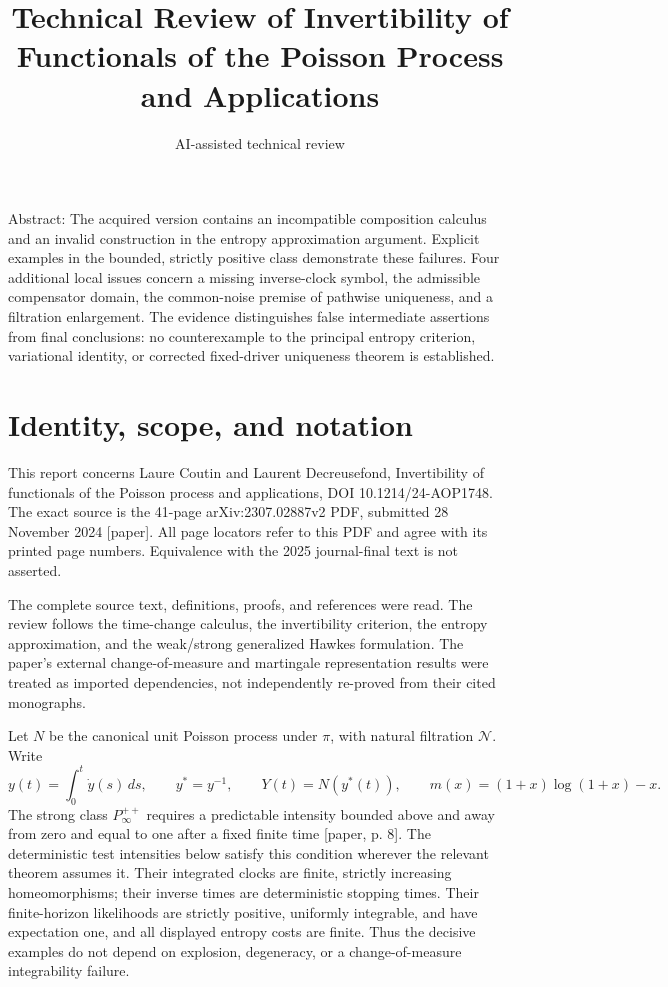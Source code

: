\documentclass[10pt]{article}
\title{Technical Review of Invertibility of Functionals of the Poisson Process and Applications}
\author{AI-assisted technical review}
\date{}
\begin{document}
\maketitle
Abstract: The acquired version contains an incompatible composition calculus and an invalid construction in the entropy approximation argument. Explicit examples in the bounded, strictly positive class demonstrate these failures. Four additional local issues concern a missing inverse-clock symbol, the admissible compensator domain, the common-noise premise of pathwise uniqueness, and a filtration enlargement. The evidence distinguishes false intermediate assertions from final conclusions: no counterexample to the principal entropy criterion, variational identity, or corrected fixed-driver uniqueness theorem is established.\par
\section*{Identity, scope, and notation}
This report concerns Laure Coutin and Laurent Decreusefond, Invertibility of functionals of the Poisson process and applications, DOI 10.1214/24-AOP1748. The exact source is the 41-page arXiv:2307.02887v2 PDF, submitted 28 November 2024 [paper]. All page locators refer to this PDF and agree with its printed page numbers. Equivalence with the 2025 journal-final text is not asserted.\par
The complete source text, definitions, proofs, and references were read. The review follows the time-change calculus, the invertibility criterion, the entropy approximation, and the weak/strong generalized Hawkes formulation. The paper’s external change-of-measure and martingale representation results were treated as imported dependencies, not independently re-proved from their cited monographs.\par
Let \(N\) be the canonical unit Poisson process under \(\pi\), with natural filtration \(\mathcal N\). Write \[y(t)=\int_0^t\dot y(s)\,ds,\qquad y^*=y^{-1},\qquad
Y(t)=N(y^*(t)),\qquad m(x)=(1+x)\log(1+x)-x.\] The strong class \(P_\infty^{++}\) requires a predictable intensity bounded above and away from zero and equal to one after a fixed finite time [paper, p. 8]. The deterministic test intensities below satisfy this condition wherever the relevant theorem assumes it. Their integrated clocks are finite, strictly increasing homeomorphisms; their inverse times are deterministic stopping times. Their finite-horizon likelihoods are strictly positive, uniformly integrable, and have expectation one, and all displayed entropy costs are finite. Thus the decisive examples do not depend on explosion, degeneracy, or a change-of-measure integrability failure.\par
\end{document}
